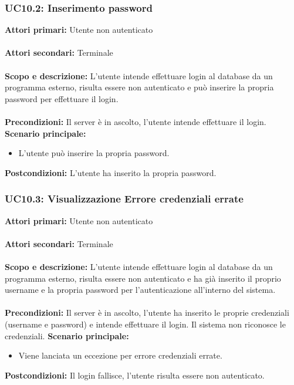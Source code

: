 \documentclass{scalatekids-article}
\begin{document}
\subsubsection{UC10.2: Inserimento password}

\textbf{Attori primari:} Utente non autenticato\\ \\
\textbf{Attori secondari:} Terminale\\ \\
\textbf{Scopo e descrizione:}
L'utente intende effettuare login al database da un programma  esterno, risulta essere non autenticato e può inserire la propria password per effettuare il login.\\ \\
\textbf{Precondizioni:} Il server è in ascolto, l'utente intende effettuare il login.
\textbf{Scenario principale:}
\begin{itemize}
\item L'utente può inserire la propria password.
\end{itemize}
\textbf{Postcondizioni:} L'utente ha inserito la propria password.

\subsubsection{UC10.3: Visualizzazione Errore credenziali errate}

\textbf{Attori primari:} Utente non autenticato\\ \\
\textbf{Attori secondari:} Terminale\\ \\
\textbf{Scopo e descrizione:}
L'utente intende effettuare login al database da un programma  esterno, risulta essere non autenticato e ha già inserito il proprio username e la propria password per l'autenticazione all'interno del sistema.\\ \\
\textbf{Precondizioni:} Il server è in ascolto, l'utente ha inserito le proprie credenziali (username e password) e intende effettuare il login. Il sistema non riconosce le credenziali.
\textbf{Scenario principale:}
\begin{itemize}
\item Viene lanciata un eccezione per errore credenziali errate.
\end{itemize}
\textbf{Postcondizioni:} Il login fallisce, l'utente risulta essere non autenticato.
\end{document}
